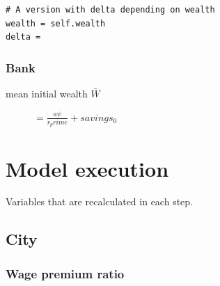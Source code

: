 \begin{description}

\begin{lstlisting}
# A version with delta depending on wealth
wealth = self.wealth
delta =
\end{lstlisting}


\end{description}




\subsubsection{Bank}
\begin{description}
\item[mean initial wealth $\bar W$] $= \frac {a\psi}{r_prime}+savings_0$
\end{description}








\section{Model execution}
Variables that are recalculated in each step.


\subsection{City}
\subsubsection{Wage premium ratio}

